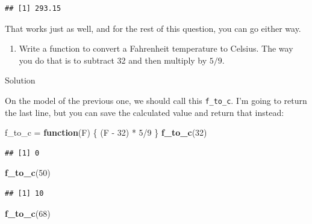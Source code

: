 \documentclass[]{tufte-book}
\newenvironment{Shaded}{}{}
\newcommand{\ControlFlowTok}[1]{\textcolor[rgb]{0.00,0.44,0.13}{\textbf{#1}}}
\newcommand{\DecValTok}[1]{\textcolor[rgb]{0.25,0.63,0.44}{#1}}
\newcommand{\KeywordTok}[1]{\textcolor[rgb]{0.00,0.44,0.13}{\textbf{#1}}}
\newcommand{\NormalTok}[1]{#1}
\newcommand{\OperatorTok}[1]{\textcolor[rgb]{0.40,0.40,0.40}{#1}}
\newcommand{\StringTok}[1]{\textcolor[rgb]{0.25,0.44,0.63}{#1}}
\providecommand{\tightlist}{%
  \setlength{\itemsep}{0pt}\setlength{\parskip}{0pt}}
\theoremstyle{definition}
\theoremstyle{definition}
\theoremstyle{definition}
\theoremstyle{remark}
\begin{document}
\begin{verbatim}
## [1] 293.15
\end{verbatim}

That works just as well, and for the rest of this question, you can go
either way.

\begin{enumerate}
\def\labelenumi{(\alph{enumi})}
\setcounter{enumi}{1}
\tightlist
\item
  Write a function to convert a Fahrenheit temperature to Celsius. The
  way you do that is to subtract 32 and then multiply by \(5/9\).
\end{enumerate}

Solution

On the model of the previous one, we should call this \texttt{f\_to\_c}.
I'm going to return the last line, but you can save the calculated value
and return that instead:

\begin{Shaded}
\begin{Highlighting}[]
\NormalTok{f_to_c =}\StringTok{ }\ControlFlowTok{function}\NormalTok{(F) \{}
\NormalTok{    (F }\OperatorTok{-}\StringTok{ }\DecValTok{32}\NormalTok{) }\OperatorTok{*}\StringTok{ }\DecValTok{5}\OperatorTok{/}\DecValTok{9}
\NormalTok{\}}
\KeywordTok{f_to_c}\NormalTok{(}\DecValTok{32}\NormalTok{)}
\end{Highlighting}
\end{Shaded}

\begin{verbatim}
## [1] 0
\end{verbatim}

\begin{Shaded}
\begin{Highlighting}[]
\KeywordTok{f_to_c}\NormalTok{(}\DecValTok{50}\NormalTok{)}
\end{Highlighting}
\end{Shaded}

\begin{verbatim}
## [1] 10
\end{verbatim}

\begin{Shaded}
\begin{Highlighting}[]
\KeywordTok{f_to_c}\NormalTok{(}\DecValTok{68}\NormalTok{)}
\end{Highlighting}
\end{Shaded}
\end{document}
